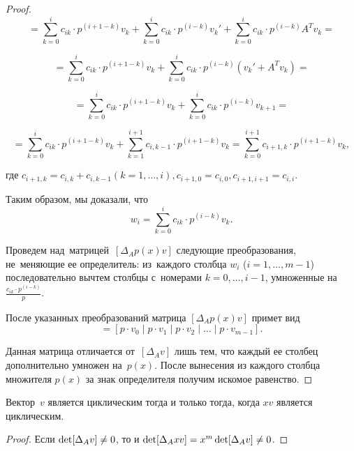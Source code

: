 \begin{proof}
\begin{equation*}
    = \sum\limits_{k = 0}^i c_{ik} \cdot p^{(i + 1 - k)} v_k +
    \sum\limits_{k = 0}^i c_{ik} \cdot p^{(i - k)} v_k' + \sum\limits_{k = 0}^i c_{ik} \cdot p^{(i - k)} A^T v_k =
\end{equation*}

\begin{equation*}
    = \sum\limits_{k = 0}^i c_{ik} \cdot p^{(i + 1 - k)} v_k +
    \sum\limits_{k = 0}^i c_{ik} \cdot p^{(i - k)} (v_k' + A^T v_k) =
\end{equation*}

\begin{equation*}
    = \sum\limits_{k = 0}^i c_{ik} \cdot p^{(i + 1 - k)} v_k +
    \sum\limits_{k = 0}^i c_{ik} \cdot p^{(i - k)} v_{k+1} =
\end{equation*}

\begin{equation*}
    = \sum\limits_{k = 0}^i c_{ik} \cdot p^{(i + 1 - k)} v_k +
    \sum\limits_{k = 1}^{i + 1} c_{i,k-1} \cdot p^{(i + 1 - k)} v_{k} =
    \sum\limits_{k = 0}^{i + 1} c_{i + 1,k} \cdot p^{(i + 1 - k)} v_k,
\end{equation*}

где $c_{i + 1,k} = c_{i,k} + c_{i,k - 1} (k = 1, \dots, i), c_{i+1,0} = c_{i,0}, c_{i+1,i+1} = c_{i,i}$.

Таким образом, мы доказали, что
\begin{equation*}
    w_i = \sum\limits_{k = 0}^i c_{ik} \cdot p^{(i - k)} v_k.
\end{equation*}

Проведем над~матрицей~$[\Delta_A p(x)v]$ следующие преобразования, не~меняющие ее определитель:
из~каждого столбца $w_{i}$ ($i = 1, \dots, m - 1$) последовательно вычтем столбцы с~номерами $k = 0, \dots, i - 1$,
умноженные на~$\frac{c_{ik} \cdot p^{(i - k)}}{p}$.

После указанных преобразований матрица $[\Delta_A p(x)v]$ примет вид
\begin{equation*}
    [\Delta_A p(x)v] = [p \cdot v_0 \mid p \cdot v_1 \mid p \cdot v_2 \mid \dots \mid p \cdot v_{m-1}].
\end{equation*}

Данная матрица отличается от~$[\Delta_A v]$ лишь тем, что каждый ее столбец дополнительно умножен на~$p(x)$.
После вынесения из каждого столбца множителя $p(x)$ за знак определителя получим искомое равенство.
\end{proof}

\begin{consequence}
Вектор~$v$ является циклическим тогда и только тогда, когда $x v$ является циклическим.
\end{consequence}

\begin{proof}
Если $\mathop{\rm det}[\Delta_A v] \neq 0$, то и $\mathop{\rm det}[\Delta_A xv] = x^{m}\mathop{\rm det}[\Delta_A v] \neq 0$.
\end{proof}
